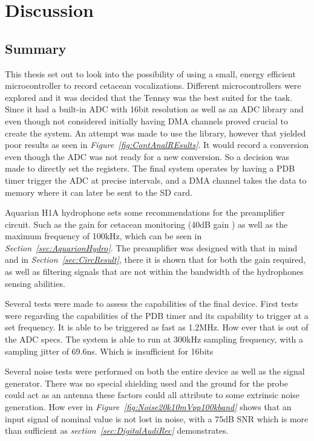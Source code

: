 \chapter{Discussion}

\section{Summary}

This thesis set out to look into the possibility of using a small, energy efficient microcontroller to record cetacean vocalizations.
Different microcontrollers were explored and it was decided that the Tennsy was the best suited for the task.
Since it had a built-in ADC with 16bit resolution as well as an ADC library and even though not considered initially having DMA channels proved crucial to create the system.
An attempt was made to use the library, however that yielded poor results as seen in \textit{Figure~\ref{fig:ContAnalREsults}}. 
It would record a conversion even though the ADC was not ready for a new conversion.
So a decision was made to directly set the registers.
The final system operates by having a PDB timer trigger the ADC at precise intervals, and a DMA channel takes the data to memory where it can later be sent to the SD card.

Aquarian H1A hydrophone sets some recommendations for the preamplifier circuit. 
Such as the gain for cetacean monitoring (40dB gain ) as well as the maximum frequency of 100kHz, which can be seen in \textit{Section~\ref{sec:AquarionHydro}}.
The preamplifier was designed with that in mind and in \textit{Section~\ref{sec:CircResult}}, there it is shown that for both the gain required, as well as filtering signals that are not within the bandwidth of the hydrophones sensing abilities.

Several tests were made to assess the capabilities of the final device.
First tests were regarding the capabilities of the PDB timer and its capability to trigger at a set frequency.
It is able to be triggered as fast as 1.2MHz.
How ever that is out of the ADC specs.
The system is able to run at 300kHz sampling frequency, with a sampling jitter of 69.6ns.
Which is insufficient for 16bits  %

Several noise tests were performed on both the entire device as well as the signal generator.
There was no special shielding used and the ground for the probe could act as an antenna these factors could all attribute to some extrinsic noise generation.
How ever in \textit{Figure~\ref{fig:Noise20k10mVpp100kband}} shows that an input signal of nominal value is not lost in noise, with a 75dB SNR which is more than sufficient as \textit{section~\ref{sec:DigitalAudiRec}} demonstrates.

